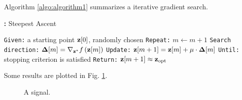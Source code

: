 Algorithm \ref{algo:algorithm1} summarizes a iterative gradient search.

\begin{algorithm}[h!]
\caption[Algorithm 1]{\!\!\textbf{:} Steepest Ascent}
\label{algo:algorithm1}
\begin{algorithmic}[1]
\STATE \texttt{Given:} a starting point $\mathbf{z}[0]$, randomly chosen
\STATE \texttt{Repeat:}
\STATE \qquad $m \leftarrow m+1$
\STATE \qquad \texttt{Search direction:} $\mathbf{\Delta}[m] = \nabla_{\mathbf{z}^*} f\left( \mathbf{z}[m] \right)$
\STATE \qquad \texttt{Update:} $\mathbf{z}[m+1] = \mathbf{z}[m] + \mu \cdot \mathbf{\Delta}[m]$
\STATE \texttt{Until:} stopping criterion is satisfied
\STATE \texttt{Return:} $\mathbf{z}[m+1] \approx \mathbf{z}_\text{opt}$
\end{algorithmic}
\end{algorithm}

Some results are plotted in Fig. \ref{fig:Plot1}. 

\begin{figure}[h]
\begin{center}
\end{center}
\caption{A signal.}
\label{fig:Plot1}
\end{figure}


